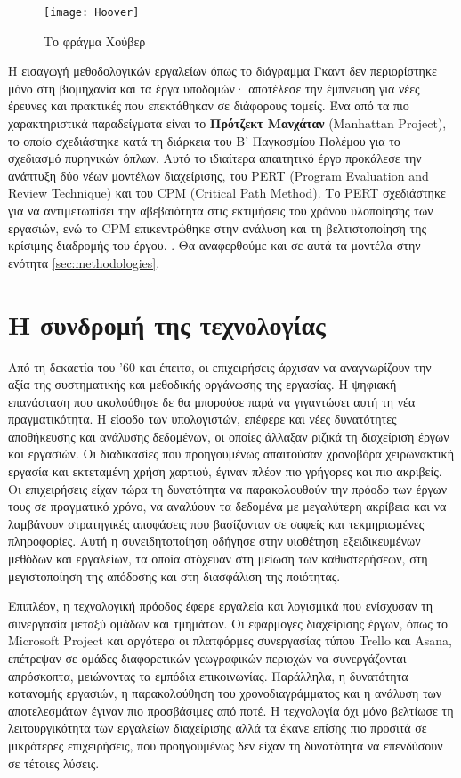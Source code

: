             \begin{figure}[h!] \noindent \centering
                \texttt{[image: Hoover]}
                \caption{\centering Το φράγμα Χούβερ \cite{britannicaHoover}}
            \end{figure}


            Η εισαγωγή μεθοδολογικών εργαλείων όπως το διάγραμμα Γκαντ δεν περιορίστηκε μόνο στη βιομηχανία και τα έργα υποδομών· αποτέλεσε την έμπνευση για νέες έρευνες και πρακτικές που επεκτάθηκαν σε διάφορους τομείς. Ένα από τα πιο χαρακτηριστικά παραδείγματα είναι το \textbf{Πρότζεκτ Μανχάταν} (Manhattan Project), το οποίο σχεδιάστηκε κατά τη διάρκεια του Β' Παγκοσμίου Πολέμου για το σχεδιασμό πυρηνικών όπλων. Αυτό το ιδιαίτερα απαιτητικό έργο προκάλεσε την ανάπτυξη δύο νέων μοντέλων διαχείρισης, του PERT (Program Evaluation and Review Technique) και του CPM (Critical Path Method). Το PERT σχεδιάστηκε για να αντιμετωπίσει την αβεβαιότητα στις εκτιμήσεις του χρόνου υλοποίησης των εργασιών, ενώ το CPM επικεντρώθηκε στην ανάλυση και τη βελτιστοποίηση της κρίσιμης διαδρομής του έργου. \cite{SaylorAcademyProjectManagement}. Θα αναφερθούμε και σε αυτά τα μοντέλα στην ενότητα \ref{sec:methodologies}.


    \section{Η συνδρομή της τεχνολογίας}
        Από τη δεκαετία του '60 και έπειτα, οι επιχειρήσεις άρχισαν να αναγνωρίζουν την αξία της συστηματικής και μεθοδικής οργάνωσης της εργασίας. Η ψηφιακή επανάσταση που ακολούθησε δε θα μπορούσε παρά να γιγαντώσει αυτή τη νέα πραγματικότητα. Η είσοδο των υπολογιστών, επέφερε και νέες δυνατότητες αποθήκευσης και ανάλυσης δεδομένων, οι οποίες άλλαξαν ριζικά τη διαχείριση έργων και εργασιών. Οι διαδικασίες που προηγουμένως απαιτούσαν χρονοβόρα χειρωνακτική εργασία και εκτεταμένη χρήση χαρτιού, έγιναν πλέον πιο γρήγορες και πιο ακριβείς. Οι επιχειρήσεις είχαν τώρα τη δυνατότητα να παρακολουθούν την πρόοδο των έργων τους σε πραγματικό χρόνο, να αναλύουν τα δεδομένα με μεγαλύτερη ακρίβεια και να λαμβάνουν στρατηγικές αποφάσεις που βασίζονταν σε σαφείς και τεκμηριωμένες πληροφορίες. Αυτή η συνειδητοποίηση οδήγησε στην υιοθέτηση εξειδικευμένων μεθόδων και εργαλείων, τα οποία στόχευαν στη μείωση των καθυστερήσεων, στη μεγιστοποίηση της απόδοσης και στη διασφάλιση της ποιότητας.

        Επιπλέον, η τεχνολογική πρόοδος έφερε εργαλεία και λογισμικά που ενίσχυσαν τη συνεργασία μεταξύ ομάδων και τμημάτων. Οι εφαρμογές διαχείρισης έργων, όπως το Microsoft Project και αργότερα οι πλατφόρμες συνεργασίας τύπου Trello και Asana, επέτρεψαν σε ομάδες διαφορετικών γεωγραφικών περιοχών να συνεργάζονται απρόσκοπτα, μειώνοντας τα εμπόδια επικοινωνίας. Παράλληλα, η δυνατότητα κατανομής εργασιών, η παρακολούθηση του χρονοδιαγράμματος και η ανάλυση των αποτελεσμάτων έγιναν πιο προσβάσιμες από ποτέ. Η τεχνολογία όχι μόνο βελτίωσε τη λειτουργικότητα των εργαλείων διαχείρισης αλλά τα έκανε επίσης πιο προσιτά σε μικρότερες επιχειρήσεις, που προηγουμένως δεν είχαν τη δυνατότητα να επενδύσουν σε τέτοιες λύσεις.

